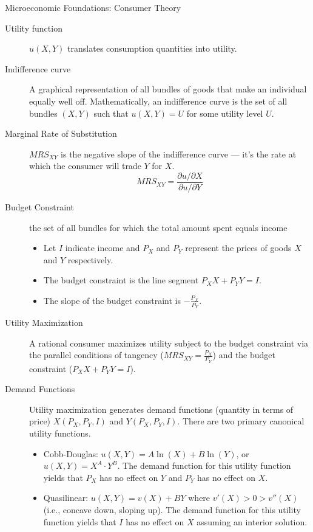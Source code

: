 \documentclass[8pt]{extarticle}
\begin{document}
  \begin{problem}{Microeconomic Foundations: Consumer Theory}
    \begin{description}
      \item[Utility function] $u(X,Y)$ translates consumption quantities into utility.
      \item[Indifference curve] A graphical representation of all bundles of goods that make an individual equally well off. Mathematically, an indifference curve is the set of all bundles $(X,Y)$ such that $u(X,Y) = U$ for some utility level $U$.
      \item[Marginal Rate of Substitution] $MRS_{XY}$ is the negative slope of the indifference curve --- it's the rate at which the consumer will trade $Y$ for $X$.
        \[
          MRS_{XY} = \frac{\partial u/\partial X}{\partial u/\partial Y}
        \] 
      \item[Budget Constraint] the set of all bundles for which the total amount spent equals income
        \begin{itemize}
          \item Let $I$ indicate income and $P_X$ and $P_Y$ represent the prices of goods $X$ and $Y$ respectively.
          \item The budget constraint is the line segment $P_X X + P_Y Y = I$.
          \item The slope of the budget constraint is $-\frac{P_X}{P_Y}$.
        \end{itemize}
      \item[Utility Maximization] A rational consumer maximizes utility subject to the budget constraint via the parallel conditions of tangency ($MRS_{XY} = \frac{P_X}{P_Y}$) and the budget constraint ($P_X X + P_Y Y = I$).
      \item[Demand Functions] Utility maximization generates demand functions (quantity in terms of price) $X(P_X,P_Y,I)$ and $Y(P_X,P_Y,I)$. There are two primary canonical utility functions.
        \begin{itemize}
          \item Cobb-Douglas: $u(X,Y) = A\ln(X) + B\ln(Y)$, or $u(X,Y) = X^A \cdot Y^B$. The demand function for this utility function yields that $P_X$ has no effect on $Y$ and $P_Y$ has no effect on $X$.
          \item Quasilinear: $u(X,Y) = v(X) + BY$ where $v'(X)>0>v''(X)$ (i.e., concave down, sloping up). The demand function for this utility function yields that $I$ has no effect on $X$ assuming an interior solution.

\end{itemize}
\end{description}
\end{problem}
\end{document}
